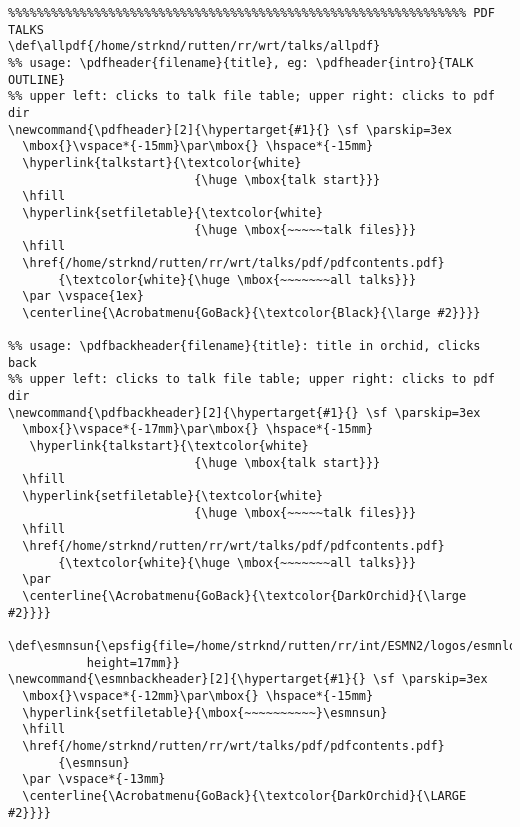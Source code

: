 {\begin{verbatim}
%%%%%%%%%%%%%%%%%%%%%%%%%%%%%%%%%%%%%%%%%%%%%%%%%%%%%%%%%%%%%%%% PDF TALKS
\def\allpdf{/home/strknd/rutten/rr/wrt/talks/allpdf}
%% usage: \pdfheader{filename}{title}, eg: \pdfheader{intro}{TALK OUTLINE}
%% upper left: clicks to talk file table; upper right: clicks to pdf dir
\newcommand{\pdfheader}[2]{\hypertarget{#1}{} \sf \parskip=3ex
  \mbox{}\vspace*{-15mm}\par\mbox{} \hspace*{-15mm} 
  \hyperlink{talkstart}{\textcolor{white}
                          {\huge \mbox{talk start}}}
  \hfill
  \hyperlink{setfiletable}{\textcolor{white}
                          {\huge \mbox{~~~~~talk files}}}
  \hfill
  \href{/home/strknd/rutten/rr/wrt/talks/pdf/pdfcontents.pdf}
       {\textcolor{white}{\huge \mbox{~~~~~~~all talks}}}
  \par \vspace{1ex}
  \centerline{\Acrobatmenu{GoBack}{\textcolor{Black}{\large #2}}}}

%% usage: \pdfbackheader{filename}{title}: title in orchid, clicks back
%% upper left: clicks to talk file table; upper right: clicks to pdf dir
\newcommand{\pdfbackheader}[2]{\hypertarget{#1}{} \sf \parskip=3ex
  \mbox{}\vspace*{-17mm}\par\mbox{} \hspace*{-15mm} 
   \hyperlink{talkstart}{\textcolor{white}
                          {\huge \mbox{talk start}}}
  \hfill
  \hyperlink{setfiletable}{\textcolor{white}
                          {\huge \mbox{~~~~~talk files}}}
  \hfill 
  \href{/home/strknd/rutten/rr/wrt/talks/pdf/pdfcontents.pdf}
       {\textcolor{white}{\huge \mbox{~~~~~~~all talks}}}
  \par
  \centerline{\Acrobatmenu{GoBack}{\textcolor{DarkOrchid}{\large #2}}}}

\def\esmnsun{\epsfig{file=/home/strknd/rutten/rr/int/ESMN2/logos/esmnlogosun.png,%
           height=17mm}}
\newcommand{\esmnbackheader}[2]{\hypertarget{#1}{} \sf \parskip=3ex
  \mbox{}\vspace*{-12mm}\par\mbox{} \hspace*{-15mm} 
  \hyperlink{setfiletable}{\mbox{~~~~~~~~~~}\esmnsun}
  \hfill 
  \href{/home/strknd/rutten/rr/wrt/talks/pdf/pdfcontents.pdf}
       {\esmnsun}
  \par \vspace*{-13mm}
  \centerline{\Acrobatmenu{GoBack}{\textcolor{DarkOrchid}{\LARGE #2}}}}



\end{verbatim}}
